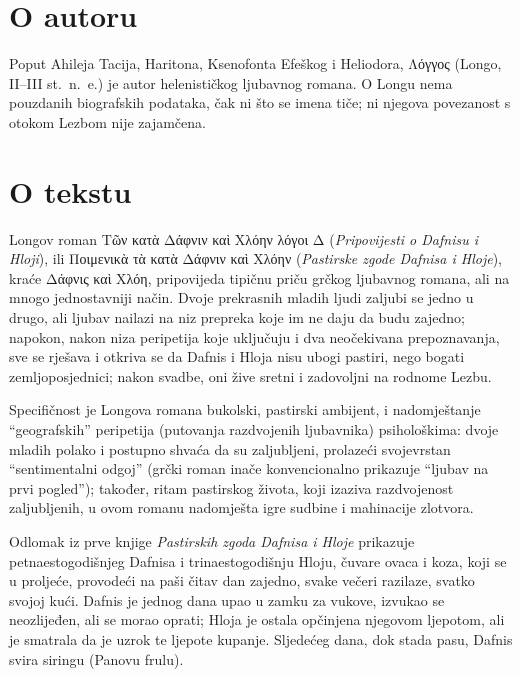 \section*{O autoru}

Poput Ahileja Tacija, Haritona, Ksenofonta Efeškog i Heliodora, \textgreek[variant=ancient]{Λόγγος} (Longo, II–III st.\ n.~e.) je autor helenističkog ljubavnog romana. O Longu nema pouzdanih biografskih podataka, čak ni što se imena tiče; ni njegova povezanost s otokom Lezbom nije zajamčena.

\section*{O tekstu}

Longov roman \textgreek[variant=ancient]{Τῶν κατὰ Δάφνιν καὶ Χλόην λόγοι Δ} (\textit{Pripovijesti o Dafnisu i Hloji}), ili \textgreek[variant=ancient]{Ποιμενικὰ τὰ κατὰ Δάφνιν καὶ Χλόην} (\textit{Pastirske zgode Dafnisa i Hloje}), kraće \textgreek[variant=ancient]{Δάφνις καὶ Χλόη,} pripovijeda tipičnu priču grčkog ljubavnog romana, ali na mnogo jednostavniji način. Dvoje prekrasnih mladih ljudi zaljubi se jedno u drugo, ali ljubav nailazi na niz prepreka koje im ne daju da budu zajedno; napokon, nakon niza peripetija koje uključuju i dva neočekivana prepoznavanja, sve se rješava i otkriva se da Dafnis i Hloja nisu ubogi pastiri, nego bogati zemljoposjednici; nakon svadbe, oni žive sretni i zadovoljni na rodnome Lezbu.

Specifičnost je Longova romana bukolski, pastirski ambijent, i nadomještanje ``geografskih'' peripetija (putovanja razdvojenih ljubavnika) psihološkima: dvoje mladih polako i postupno shvaća da su zaljubljeni, prolazeći svojevrstan ``sentimentalni odgoj'' (grčki roman inače konvencionalno prikazuje ``ljubav na prvi pogled''); također, ritam pastirskog života, koji izaziva razdvojenost zaljubljenih, u ovom romanu nadomješta igre sudbine i mahinacije zlotvora.

Odlomak iz prve knjige \textit{Pastirskih zgoda Dafnisa i Hloje} prikazuje petnaestogodišnjeg Dafnisa i trinaestogodišnju Hloju, čuvare ovaca i koza, koji se u proljeće, provodeći na paši čitav dan zajedno, svake večeri razilaze, svatko svojoj kući. Dafnis je jednog dana upao u zamku za vukove, izvukao se neozlijeđen, ali se morao oprati; Hloja je ostala opčinjena njegovom ljepotom, ali je smatrala da je uzrok te ljepote kupanje. Sljedećeg dana, dok stada pasu, Dafnis svira siringu (Panovu frulu).


